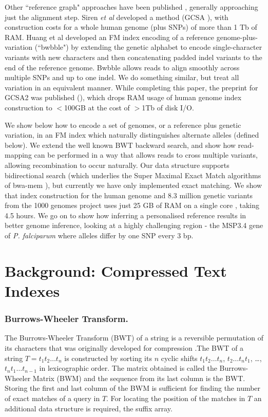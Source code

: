 \documentclass[runningheads,a4paper]{llncs}
\begin{document}
Other ``reference graph" approaches have been published \cite{korbinian,siren1,huang}, generally approaching just the alignment step.  Siren \textit{et al} developed a method (GCSA \cite{siren1}), with construction costs for a whole human genome (plus SNPs) of more than 1 Tb of RAM. Huang et al \cite{huang} developed an FM index \cite{fmindex} encoding of a reference genome-plus-variation (``bwbble") by extending the genetic alphabet to encode single-character variants with new characters and then concatenating padded indel variants to the end of the reference genome. Bwbble allows reads to align smoothly across multiple SNPs and up to one indel. We do something similar, but treat all variation in an equivalent manner.  While completing this paper, the preprint for GCSA2 was published (\cite{siren2}), which drops RAM usage of human genome index construction to $<$100GB at the cost of $>$1Tb of disk I/O.   

 We show below how to encode a set of genomes, or a reference plus  genetic variation, in an FM index which naturally distinguishes alternate alleles (defined below). We extend the well known  BWT backward search, and show how read-mapping can be performed in a way that allows reads to cross multiple variants, allowing recombination to occur naturally. Our data structure  supports bidirectional search (which underlies the Super Maximal Exact Match algorithms of bwa-mem \cite{bwa}), but currently we have only implemented exact matching. We show that index construction for the human genome and 8.3 million genetic variants from the 1000 genomes project uses just 25 GB of RAM on a single core , taking 4.5 hours. We go on to show how inferring a personalised reference results in better genome inference, looking at a highly challenging region - the MSP3.4 gene of \textit{P. falciparum} where alleles differ by one SNP every 3 bp.  


\section{Background: Compressed Text Indexes}

\subsubsection{Burrows-Wheeler Transform.}
The Burrows-Wheeler Transform (BWT) of a string is a reversible permutation of its characters that was originally developed for compression \cite{bwt}.The BWT of a string $T=t_1t_2 \ldots t_n$ is constructed by sorting its $n$ cyclic shifts $t_1t_2 \ldots t_n$, $t_2 \ldots t_n t_1$, \ldots,  $t_n t_1 \ldots t_{n-1}$ in lexicographic order. The matrix obtained is called the Burrows-Wheeler Matrix (BWM) and the sequence from its last column is the BWT. Storing the first and last column of the BWM is sufficient for finding the number of exact matches of a query in $T$. For locating the position of the matches in $T$ an additional data structure is required, the suffix array. 
\end{document}
